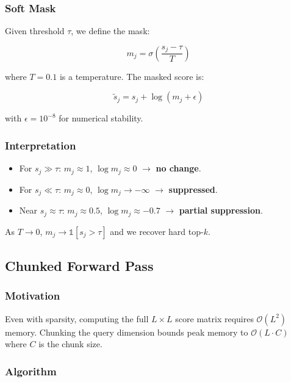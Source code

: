 \subsubsection{Soft Mask}

Given threshold $\tau$, we define the mask:

\[
m_j = \sigma\!\left(\frac{s_j - \tau}{T}\right)
\]

where $T = 0.1$ is a temperature. The masked score is:

\[
\tilde{s}_j = s_j + \log(m_j + \epsilon)
\]

with $\epsilon = 10^{-8}$ for numerical stability.

\subsubsection{Interpretation}

\begin{itemize}
\item For $s_j \gg \tau$: $m_j \approx 1$, $\log m_j \approx 0$ $\to$ \textbf{no change}.
\item For $s_j \ll \tau$: $m_j \approx 0$, $\log m_j \to -\infty$ $\to$ \textbf{suppressed}.
\item Near $s_j \approx \tau$: $m_j \approx 0.5$, $\log m_j \approx -0.7$ $\to$ \textbf{partial suppression}.

\end{itemize}
As $T \to 0$, $m_j \to \mathbb{1}[s_j > \tau]$ and we recover hard top-$k$.

\subsection{Chunked Forward Pass}

\subsubsection{Motivation}

Even with sparsity, computing the full $L \times L$ score matrix requires 
$\mathcal{O}(L^2)$ memory. Chunking the query dimension bounds peak memory 
to $\mathcal{O}(L \cdot C)$ where $C$ is the chunk size.

\subsubsection{Algorithm}

